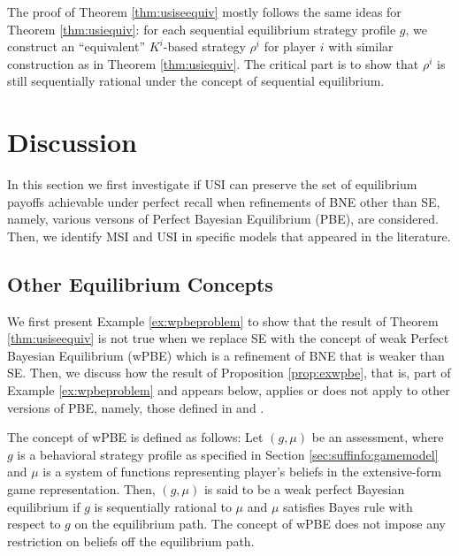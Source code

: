 \documentclass[pdflatex,sn-basic]{sn-jnl}
\newcommand{\Comp}{K}
\theoremstyle{thmstyleone}%
\theoremstyle{thmstyletwo}%
\theoremstyle{thmstylethree}%
\begin{document}
The proof of Theorem \ref{thm:usiseequiv} mostly follows the same ideas for Theorem \ref{thm:usiequiv}: for each sequential equilibrium strategy profile $g$, we construct an ``equivalent'' $\Comp^i$-based strategy $\rho^i$ for player $i$ with similar construction as in Theorem \ref{thm:usiequiv}. The critical part is to show that $\rho^i$ is still sequentially rational under the concept of sequential equilibrium. 


\section{Discussion}\label{sec:siapplications}
{In this section we first investigate if USI can preserve the set of equilibrium payoffs achievable under perfect recall when refinements of BNE other than SE, namely, various versons of Perfect Bayesian Equilibrium (PBE), are considered. Then, we identify MSI and USI in specific models that appeared in the literature.}

\subsection{Other Equilibrium Concepts}
{We first present Example \ref{ex:wpbeproblem} to show that the result of Theorem \ref{thm:usiseequiv} is not true when we replace SE with the concept of weak Perfect Bayesian Equilibrium (wPBE) \citep{mas1995microeconomic} which is a refinement of BNE that is weaker than SE. Then, we discuss how the result of Proposition \ref{prop:exwpbe}, that is, part of Example \ref{ex:wpbeproblem} and appears below, applies or does not apply to other versions of PBE, namely, those defined in \cite{watson2017general} and \cite{battigalli1996strategic}.}

The concept of wPBE is defined as follows: 
Let $(g, \mu)$ be an assessment, where $g$ is a behavioral strategy profile as specified in Section \ref{sec:suffinfo:gamemodel} and $\mu$ is a system of functions representing player's beliefs in the extensive-form game representation. Then, $(g, \mu)$ is said to be a weak perfect Bayesian equilibrium %
\citep{mas1995microeconomic} if $g$ is sequentially rational to $\mu$ and $\mu$ satisfies Bayes rule with respect to $g$ on the equilibrium path. The concept of wPBE does not impose any restriction on beliefs off the equilibrium path.
\end{document}
